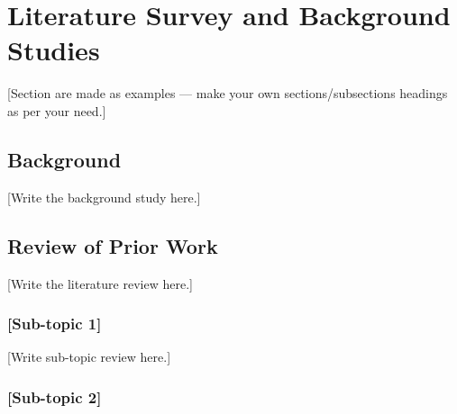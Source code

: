 


\chapter{Literature Survey and Background Studies}
\label{chap:literature}

[Section are made as examples — make your own sections/subsections headings as per your need.]



\section{Background}
\label{sec:background}


[Write the background study here.]

\section{Review of Prior Work}
\label{sec:prior_work}


[Write the literature review here.]

\subsection{[Sub-topic 1]}
\label{subsec:subtopic1}

[Write sub-topic review here.]

\subsection{[Sub-topic 2]}
\label{subsec:subtopic2}

